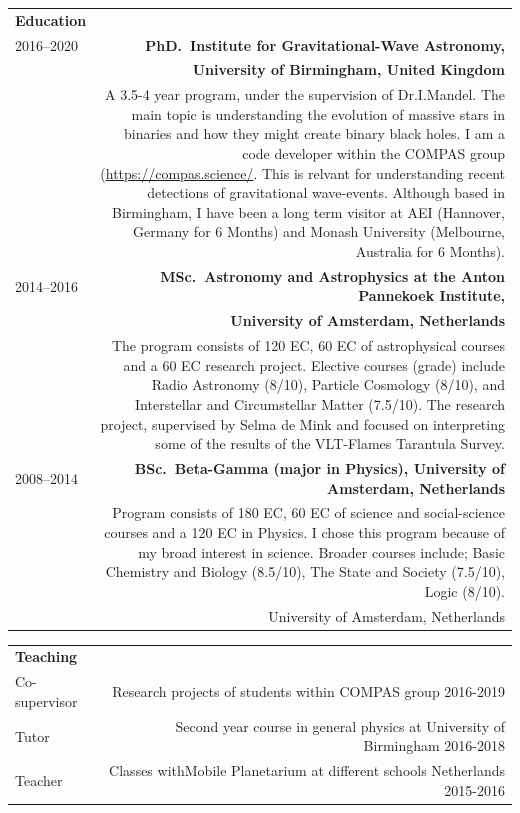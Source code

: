 \documentclass[]{res} %
\begin{document}




\begin{tabular}{L!{\VRule}R}
\Large \bf Education \normalsize & \\ [5pt]
2016--2020 &{\textbf{PhD.\ Institute for Gravitational-Wave Astronomy,}}\\
          &{\textbf{University of Birmingham, United Kingdom}}\\[1pt]
          &{A 3.5-4 year program, under the supervision of Dr.I.Mandel. The main topic is
          understanding the evolution of massive stars in binaries and how they might create binary
          black holes. I am a code developer within the COMPAS group
           (\url{https://compas.science/}. This is relvant for understanding recent detections
           of gravitational wave-events. Although based in Birmingham, I have been a long term 
            visitor at AEI (Hannover, Germany for 6 Months) and
            Monash University (Melbourne, Australia for 6 Months).}\\[5pt]

2014--2016&{\textbf{MSc.\ Astronomy and Astrophysics at the Anton Pannekoek Institute,}}\\
          &{\textbf{University of Amsterdam, Netherlands}}\\[1pt]
	  &{The program consists of 120 EC, 60 EC of astrophysical courses and a 60 EC research project. 
            Elective courses (grade) include Radio Astronomy (8/10), Particle Cosmology (8/10), and Interstellar and Circumstellar Matter (7.5/10). The research project, supervised by Selma de Mink and focused on interpreting some of the results of the VLT-Flames Tarantula Survey. }\\[5pt]


2008--2014&{\bf BSc.\ Beta-Gamma (major in Physics), University of Amsterdam, Netherlands}\\[1pt]
          &{Program consists of 180 EC, 60 EC of science and social-science courses and a 120 EC in Physics.  I chose this program because of my broad interest in science. Broader courses include; Basic Chemistry and Biology (8.5/10), The State and Society (7.5/10), Logic (8/10).}\\
	  &{University of Amsterdam, Netherlands}\\
\end{tabular}


\begin{tabular}{L!{\VRule}R}
\Large \bf Teaching \normalsize & \\ [5pt]
Co-supervisor   & {Research projects of students within COMPAS group 2016-2019}\\[5pt]

Tutor   & {Second year course in general physics at  University of Birmingham 2016-2018}\\[5pt]

Teacher & {Classes withMobile Planetarium at different schools Netherlands 2015-2016}\\[5pt]

\end{tabular}
\end{document}
